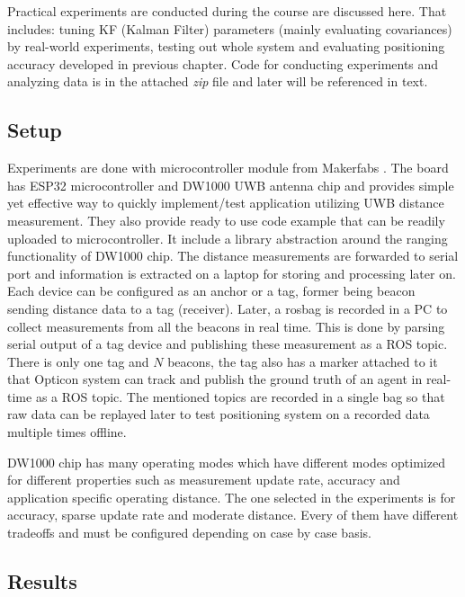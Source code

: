 Practical experiments are conducted during the course are discussed here. That includes: tuning KF (Kalman Filter) parameters (mainly evaluating covariances) by real-world experiments, testing out whole system and evaluating positioning accuracy developed in previous chapter. Code for conducting experiments and analyzing data is in the attached \emph{zip} file and later will be referenced in text.

\subsection{Setup}

Experiments are done with microcontroller module from Makerfabs \cite{makerfabs}. The board has ESP32 microcontroller and DW1000 UWB antenna chip and provides simple yet effective way to quickly implement/test application utilizing UWB distance measurement. They also provide ready to use code example that can be readily uploaded to microcontroller. It include a library abstraction around the ranging functionality of DW1000 chip. The distance measurements are forwarded to serial port and information is extracted on a laptop for storing and processing later on. Each device can be configured as an anchor or a tag, former being beacon sending distance data to a tag (receiver). Later, a rosbag is recorded in a PC to collect measurements from all the beacons in real time. This is done by parsing serial output of a tag device and publishing these measurement as a ROS topic. There is only one tag and $N$ beacons, the tag also has a marker attached to it that Opticon system can track and publish the ground truth of an agent in real-time as a ROS topic. The mentioned topics are recorded in a single bag so that raw data can be replayed later to test positioning system on a recorded data multiple times offline.

DW1000 chip has many operating modes which have different modes optimized for different properties such as measurement update rate, accuracy and application specific operating distance. The one selected in the experiments is for accuracy, sparse update rate and moderate distance. Every of them have different tradeoffs and must be configured depending on case by case basis.

\subsection{Results}

